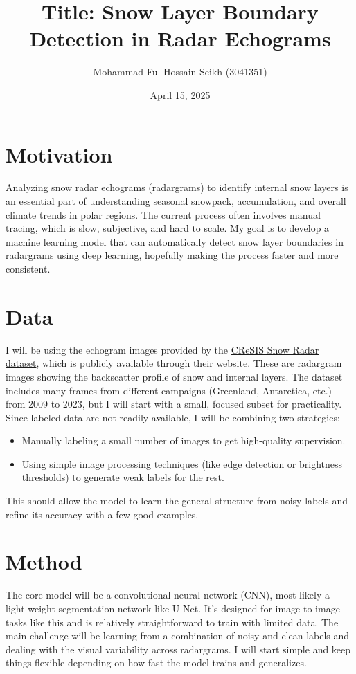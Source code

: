 \documentclass{article}
\title{Title: Snow Layer Boundary Detection in Radar Echograms}
\author{Mohammad Ful Hossain Seikh (3041351)}
\date{April 15, 2025}
\begin{document}
\maketitle

\section*{Motivation}

Analyzing snow radar echograms (radargrams) to identify internal snow layers is an essential part of understanding seasonal snowpack, accumulation, and overall climate trends in polar regions. The current process often involves manual tracing, which is slow, subjective, and hard to scale. My goal is to develop a machine learning model that can automatically detect snow layer boundaries in radargrams using deep learning, hopefully making the process faster and more consistent.

\section*{Data}

I will be using the echogram images provided by the \href{https://data.cresis.ku.edu/data/snow/}{CReSIS Snow Radar dataset}, which is publicly available through their website. These are radargram images showing the backscatter profile of snow and internal layers. The dataset includes many frames from different campaigns (Greenland, Antarctica, etc.) from 2009 to 2023, but I will start with a small, focused subset for practicality. Since labeled data are not readily available, I will be combining two strategies:
\begin{itemize}
    \item Manually labeling a small number of images to get high-quality supervision.
    \item Using simple image processing techniques (like edge detection or brightness thresholds) to generate weak labels for the rest.
\end{itemize}
This should allow the model to learn the general structure from noisy labels and refine its accuracy with a few good examples.

\section*{Method}

The core model will be a convolutional neural network (CNN), most likely a light-weight segmentation network like U-Net. It’s designed for image-to-image tasks like this and is relatively straightforward to train with limited data. The main challenge will be learning from a combination of noisy and clean labels and dealing with the visual variability across radargrams. I will start simple and keep things flexible depending on how fast the model trains and generalizes.
\end{document}

